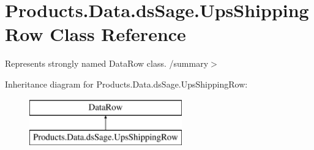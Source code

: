 \hypertarget{class_products_1_1_data_1_1ds_sage_1_1_ups_shipping_row}{}\section{Products.\+Data.\+ds\+Sage.\+Ups\+Shipping\+Row Class Reference}
\label{class_products_1_1_data_1_1ds_sage_1_1_ups_shipping_row}


Represents strongly named Data\+Row class. /summary$>$  


Inheritance diagram for Products.\+Data.\+ds\+Sage.\+Ups\+Shipping\+Row\+:\begin{figure}[H]
\begin{center}
\leavevmode
\includegraphics[height=2.000000cm]{class_products_1_1_data_1_1ds_sage_1_1_ups_shipping_row}
\end{center}
\end{figure}
